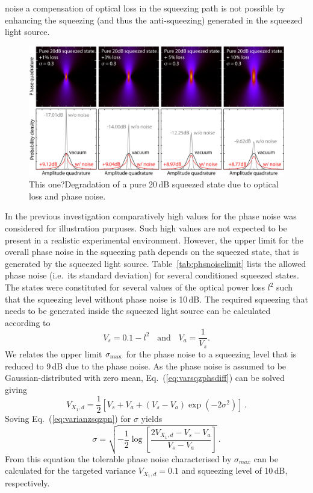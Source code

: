 noise a compensation of optical loss in the  squeezing path is not possible by enhancing the  squeezing (and thus the anti-squeezing) generated in the squeezed light source.

\begin{figure}
\centering
\includegraphics[scale=0.77]{./Sec_Optics/Wig_20dB_loss.jpg}
\caption{This one?Degradation of a pure 20\,dB squeezed state due to optical loss and phase noise.}
\label{fig:phasediffusedSQZ20dB}
\end{figure}


In the previous investigation comparatively high values for the phase noise was considered for illustration purpuses. Such high values are not expected to be present in a realistic experimental environment. However, the upper limit for the overall phase noise in the squeezing path depends on the squeezed state, that is generated by the squeezed light source. Table~\ref{tab:phsnoiselimit} lists the allowed phase noise (i.e.\ its standard deviation) for several conditioned squeezed states. The states were constituted for several values of the optical power  loss $l^2$ such that the  squeezing level without phase noise is 10\,dB. The required squeezing  that needs to be generated inside the squeezed light source can be calculated according to
\begin{equation}
V_s = 0.1 -l^2\hspace{11pt}\text{and}\hspace{11pt}V_a = \frac{1}{V_s}.
\end{equation}
We relates the upper limit $\sigma_{\rm max}$ for the phase noise to a squeezing level that is reduced to 9\,dB due to the phase noise. As the phase noise is assumed to be Gaussian-distributed with zero mean, Eq.~(\ref{eq:varsqzphsdiff}) can be solved giving
\begin{equation}
V_{X_1,d} = \frac{1}{2}\left[V_s+V_a+(V_s-V_a)\exp\left(-2\sigma^2\right)\right]\,.\label{eq:varianzsqzpn}
\end{equation}
Soving Eq.~(\ref{eq:varianzsqzpn}) for $\sigma$ yields
\begin{equation}
\sigma = \sqrt{-\frac{1}{2}\log\left[\frac{2V_{X_1,d}-V_s-V_a}{V_s-V_a}\right]}\,.
\end{equation}
From this equation the tolerable phase noise characterised  by $\sigma_{max}$ can be calculated for the targeted variance  $V_{X_1,d}=0.1$ and squeezing level of 10\,dB, respectively.


